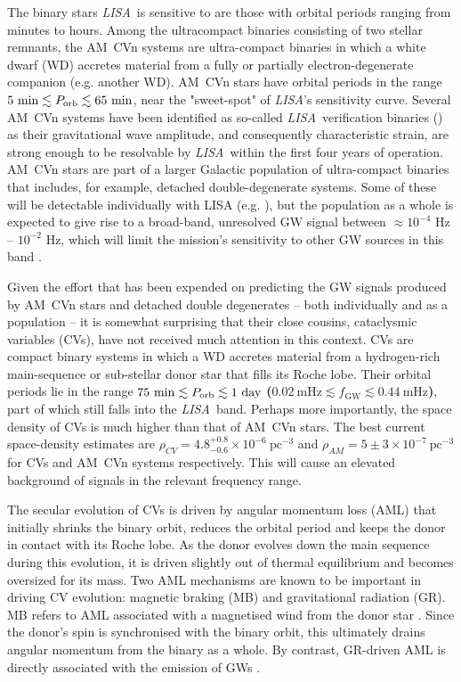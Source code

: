 \documentclass[fleqn,usenatbib]{mnras}
\newcommand{\lisa}{{\it LISA}}
\begin{document}
The binary stars \lisa\ is sensitive to are those with orbital periods ranging from minutes to hours. Among the ultracompact binaries consisting of two stellar remnants, the AM~CVn systems are ultra-compact binaries in which a white dwarf (WD) accretes material from a fully or partially electron-degenerate companion (e.g. another WD). AM~CVn stars have orbital periods in the range $5~\mathrm{min} \lesssim P_{\rm{orb}} \lesssim 65~\mathrm{min}$, near the "sweet-spot" of \lisa's sensitivity curve. Several AM~CVn systems have been identified as so-called \lisa\ verification binaries (\citealt{kupfer18,kupfer23}) as their gravitational wave amplitude, and consequently characteristic strain, are strong enough to be resolvable by \lisa\ within the first four years of operation. AM~CVn stars are part of a larger Galactic population of ultra-compact binaries that includes, for example, detached double-degenerate systems. Some of these will be detectable individually with LISA (e.g. \citealt{burdge20}), but the population as a whole is expected to give rise to a broad-band, unresolved GW signal between $\approx 10^{-4}$ Hz -- $10^{-2}$ Hz, which will limit the mission's sensitivity to other GW sources in this band \citep{nelemans01, ruiter10, nissanke12, korol17, lamberts19, breivik20a, breivik2020b, korol22, thiele2023}.

Given the effort that has been expended on predicting the GW signals produced by AM~CVn stars and detached double degenerates -- both individually and as a population -- it is somewhat surprising that their close cousins, cataclysmic variables (CVs), have not received much attention in this context. CVs are compact binary systems in which a WD accretes material from a hydrogen-rich main-sequence or sub-stellar donor star that fills its Roche lobe. Their orbital periods lie in the range $75~\mathrm{min} \lesssim P_{\rm{orb}} \lesssim 1~\mathrm{day}$ {\bf{($0.02~\mathrm{mHz}\lesssim f_{\mathrm{GW}}\lesssim 0.44~\mathrm{mHz}$)}}, part of which still falls into the \lisa\ band. Perhaps more importantly, the space density of CVs is much higher than that of AM~CVn stars. The best current space-density estimates are $\rho_{CV} = 4.8^{+0.8}_{-0.6} \times 10^{-6}~\mathrm{pc^{-3}}$\citep{pala20} and $\rho_{AM} = 5\pm 3 \times 10^{-7}~\mathrm{pc^{-3}}$\citep{carter13} for CVs and AM~CVn systems respectively. This will cause an elevated background of signals in the relevant frequency range. 

The secular evolution of CVs is driven by angular momentum loss (AML) that initially shrinks the binary orbit, reduces the orbital period and keeps the donor in contact with its Roche lobe. As the donor evolves down the main sequence during this evolution, it is driven slightly out of thermal equilibrium and becomes oversized for its mass. Two AML mechanisms are known to be important in driving CV evolution: magnetic braking (MB) and gravitational radiation (GR). MB refers to AML associated with a magnetised wind from the donor star \citep[e.g.][]{Verbunt1981, Rappaport1983}. Since the donor's spin is synchronised with the binary orbit, this ultimately drains angular momentum from the binary as a whole. By contrast, GR-driven AML is directly associated with the emission of GWs \citep[e.g.][]{Peters1964}. 
\end{document}
